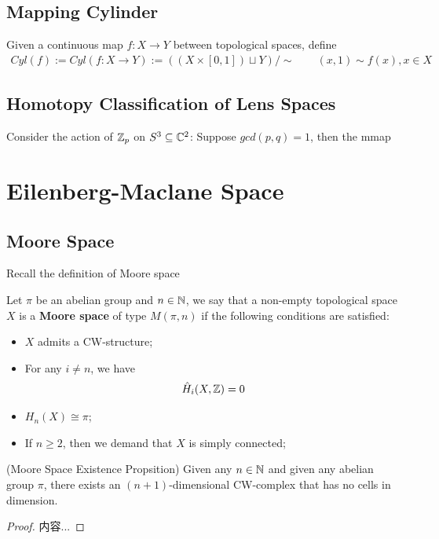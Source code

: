 \documentclass[Total.tex]{subfiles}
\begin{document}
		\subsection{Mapping Cylinder}
			\begin{Def}
				Given a continuous map $f:X\rightarrow Y$ between topological spaces, define
				\begin{gather*}
					Cyl(f):=Cyl(f:X\rightarrow Y):=((X\times [0,1])\sqcup Y)/\sim\qquad (x,1)\sim f(x),x\in X
				\end{gather*}
			\end{Def}
		\subsection{Homotopy Classification of Lens Spaces}
			\begin{Def}
				Consider the action of $\mathbb{Z}_p$ on $S^3\subseteq \mathbb{C}^2$: Suppose $gcd(p,q)=1$, then the mmap
			\end{Def}
	\section{Eilenberg-Maclane Space}
		\subsection{Moore Space}
			Recall the definition of Moore space
			\begin{Def}
				Let $\pi$ be an abelian group and $n\in \mathbb{N}$, we say that a non-empty topological space $X$ is a \textbf{Moore space} of type $M(\pi,n)$ if the following conditions are satisfied:
				\begin{itemize}
					\item $X$ admits a CW-structure;
					\item For any $i\not=n$, we have
					\begin{gather*}
						\hat{H}_i(X,\mathbb{Z})=0
					\end{gather*}
					\item $H_n(X)\cong \pi$;
					\item If $n\geq 2$, then we demand that $X$ is simply connected;
				\end{itemize}
			\end{Def}
			
			\begin{proposition}
				(Moore Space Existence Propsition) Given any $n\in \mathbb{N}$ and given any abelian group $\pi$, there exists an $(n+1)$-dimensional CW-complex that has no cells in dimension.
			\end{proposition}
			\begin{proof}
				内容...
			\end{proof}
\end{document}
